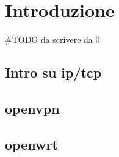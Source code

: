 
\chapter{Introduzione}
\setlength{\parskip}{1em}
\setlength{\parindent}{0em}
\renewcommand{\baselinestretch}{1.15}

\#TODO da scrivere da 0 

\section{Intro su ip/tcp} 
\label{Scopo_e_analisi_del_progetto}


\section{openvpn}
\label{caratteristiche_vps}


\section{openwrt}
\label{caratteristiche_gateway}

